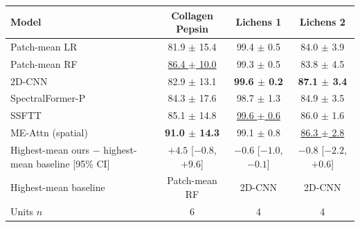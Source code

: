 \small
\begin{tabular}{lccc}
\toprule
Model & Collagen Pepsin & Lichens 1 & Lichens 2 \\
\midrule
Patch-mean LR & 81.9 $\pm$ 15.4 & 99.4 $\pm$ 0.5 & 84.0 $\pm$ 3.9 \\
Patch-mean RF & \underline{86.4 $\pm$ 10.0} & 99.3 $\pm$ 0.5 & 83.8 $\pm$ 4.5 \\
2D-CNN & 82.9 $\pm$ 13.1 & \textbf{99.6 $\pm$ 0.2} & \textbf{87.1 $\pm$ 3.4} \\
SpectralFormer-P & 84.3 $\pm$ 17.6 & 98.7 $\pm$ 1.3 & 84.9 $\pm$ 3.5 \\
SSFTT & 85.1 $\pm$ 14.8 & \underline{99.6 $\pm$ 0.6} & 86.0 $\pm$ 1.6 \\
\midrule
ME-Attn (spatial) & \textbf{91.0 $\pm$ 14.3} & 99.1 $\pm$ 0.8 & \underline{86.3 $\pm$ 2.8} \\
\midrule
Highest-mean ours $-$ highest-mean baseline [95\% CI] & $+4.5$ [$-0.8$, $+9.6$] & $-0.6$ [$-1.0$, $-0.1$] & $-0.8$ [$-2.2$, $+0.6$] \\
Highest-mean baseline & Patch-mean RF & 2D-CNN & 2D-CNN \\
\midrule
Units $n$ & 6 & 4 & 4 \\
\bottomrule
\end{tabular}
